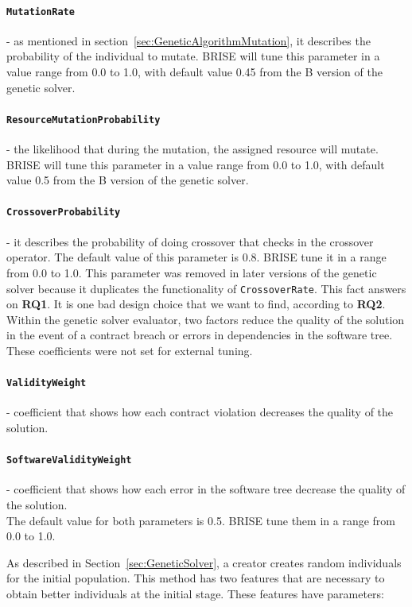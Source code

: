 \paragraph{\texttt{MutationRate}} - as mentioned in section~\ref{sec:GeneticAlgorithmMutation}, it describes the probability of the individual to mutate. BRISE will tune this parameter in a value range from 0.0 to 1.0, with default value 0.45 from the B version of the genetic solver.
\paragraph{\texttt{ResourceMutationProbability}} - the likelihood that during the mutation, the assigned resource will mutate. BRISE will tune this parameter in a value range from 0.0 to 1.0, with default value 0.5 from the B version of the genetic solver.
\paragraph{\texttt{CrossoverProbability}} - it describes the probability of doing crossover that checks in the crossover operator. The default value of this parameter is 0.8. BRISE tune it in a range from 0.0 to 1.0. This parameter was removed in later versions of the genetic solver because it duplicates the functionality of \texttt{CrossoverRate}. This fact answers on \textbf{RQ1}. It is one bad design choice that we want to find, according to \textbf{RQ2}.\\ 


Within the genetic solver evaluator, two factors reduce the quality of the solution in the event of a contract breach or errors in dependencies in the software tree. These coefficients were not set for external tuning.
\paragraph{\texttt{ValidityWeight}} - coefficient that shows how each contract violation decreases the quality of the solution.
\paragraph{\texttt{SoftwareValidityWeight}} - coefficient that shows how each error in the software tree decrease the quality of the solution.\\

The default value for both parameters is 0.5. BRISE tune them in a range from 0.0 to 1.0.

As described in Section~\ref{sec:GeneticSolver}, a creator creates random individuals for the initial population.
This method has two features that are necessary to obtain better individuals at the initial stage. These features have parameters:
